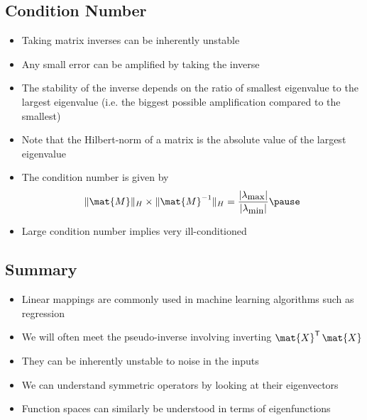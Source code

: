 \documentclass[25pt,landscape,footrule]{foils}
\begin{document}

\begin{slide}
\section[-2]{Condition Number}

\begin{PauseHighLight}
  \begin{itemize}\squeeze
  \item Taking matrix inverses can be inherently unstable\pause
  \item Any small error can be amplified by taking the inverse\pause
  \item The stability of the inverse depends on the ratio of smallest
    eigenvalue to the largest eigenvalue (i.e. the biggest possible
    amplification compared to the smallest)\pause
  \item Note that the Hilbert-norm of a matrix is the absolute value of
    the largest eigenvalue\pause
  \item The condition number is given by
    \begin{align*}
      \|\mat{M}\|_H \times \|\mat{M}^{-1}\|_H =
      \frac{|\lambda_{\text{\small max}}|}{|\lambda_{\text{\small min}}|}\pause
    \end{align*}
  \item Large condition number implies very ill-conditioned\pause
  \end{itemize}
\end{PauseHighLight}

\end{slide}




\begin{slide}
\section{Summary}

\begin{PauseHighLight}
  \begin{itemize}
  \item Linear mappings are commonly used in machine learning algorithms
    such as regression\pause
  \item We will often meet the pseudo-inverse involving inverting
    $\mat{X}^\tr\,\mat{X}$\pause 
  \item They can be inherently unstable to noise in the inputs\pause
  \item We can understand symmetric operators by looking at their eigenvectors\pause
  \item Function spaces can similarly be understood in terms of eigenfunctions\pause
  \end{itemize}
\end{PauseHighLight}

\end{slide}



\end{document}
